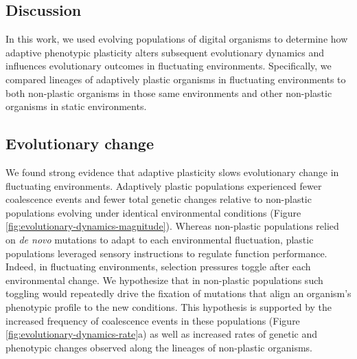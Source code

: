 \documentclass[utf8]{frontiersSCNS} %
\begin{document}
\begin{raggedbottom}
\section{Discussion}

In this work, we used evolving populations of digital organisms to determine how adaptive phenotypic plasticity alters subsequent evolutionary dynamics and influences evolutionary outcomes in fluctuating environments.
Specifically, we compared lineages of adaptively plastic organisms in fluctuating environments to both non-plastic organisms in those same environments and other non-plastic organisms in static environments.

\subsection{Evolutionary change}

We found strong evidence that adaptive plasticity slows evolutionary change in fluctuating environments.
Adaptively plastic populations experienced fewer coalescence events and fewer total genetic changes relative to non-plastic populations evolving under identical environmental conditions (Figure \ref{fig:evolutionary-dynamics-magnitude}).
Whereas non-plastic populations relied on \textit{de novo} mutations to adapt to each environmental fluctuation, plastic populations leveraged sensory instructions to regulate function performance.
Indeed, in fluctuating environments, selection pressures toggle after each environmental change.
We hypothesize that in non-plastic populations such toggling would repeatedly drive the fixation of mutations that align an organism's phenotypic profile to the new conditions.
This hypothesis is supported by the increased frequency of coalescence events in these populations (Figure \ref{fig:evolutionary-dynamics-rate}a) as well as increased rates of genetic and phenotypic changes observed along the lineages of non-plastic organisms.


\end{raggedbottom}
\end{document}
